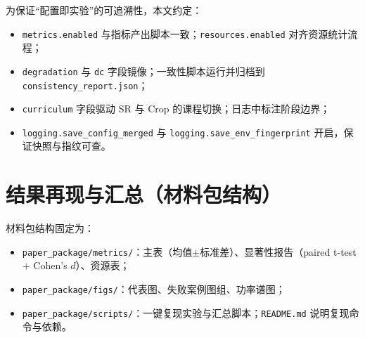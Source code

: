 为保证“配置即实验”的可追溯性，本文约定：
\begin{itemize}
  \item \texttt{metrics.enabled} 与指标产出脚本一致；\texttt{resources.enabled} 对齐资源统计流程；
  \item \texttt{degradation} 与 \texttt{dc} 字段镜像；一致性脚本运行并归档到 \texttt{consistency\_report.json}；
  \item \texttt{curriculum} 字段驱动 SR 与 Crop 的课程切换；日志中标注阶段边界；
  \item \texttt{logging.save\_config\_merged} 与 \texttt{logging.save\_env\_fingerprint} 开启，保证快照与指纹可查。
\end{itemize}

\section{结果再现与汇总（材料包结构）}\label{sec:reproduce_summary}

材料包结构固定为：
\begin{itemize}
  \item \texttt{paper\_package/metrics/}：主表（均值$\pm$标准差）、显著性报告（paired t-test + Cohen's $d$）、资源表；
  \item \texttt{paper\_package/figs/}：代表图、失败案例图组、功率谱图；
  \item \texttt{paper\_package/scripts/}：一键复现实验与汇总脚本；\texttt{README.md} 说明复现命令与依赖。
\end{itemize}


